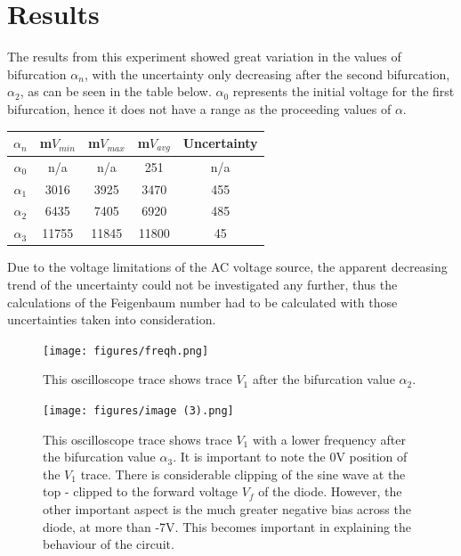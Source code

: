 \documentclass[10pt,twocolumn,letterpaper]{article}
\begin{document}
\section{Results}

The results from this experiment showed great variation in the values of bifurcation \(\alpha_n\), with the uncertainty only decreasing after the second bifurcation, \(\alpha_2\), as can be seen in the table below.  \(\alpha_0\) represents the initial voltage for the first bifurcation, hence it does not have a range as the proceeding values of \(\alpha\). 

\begin{table}[h]
\begin{tabular}{|c|cccc|}
\hline
\(\alpha_n\)  & m\(V_{min}\) & m\(V_{max}\) & m\(V_{avg}\) & Uncertainty  \\ \hline
\(\alpha_0\)  & n/a          & n/a          & 251          & n/a          \\
\(\alpha_1\)  & 3016         & 3925         & 3470         & 455          \\
\(\alpha_2\)  & 6435         & 7405         & 6920         & 485          \\ 
\(\alpha_3\)  & 11755        & 11845        & 11800        & 45           \\ \hline
\end{tabular}
\end{table}

Due to the voltage limitations of the AC voltage source, the apparent decreasing trend of the uncertainty could not be investigated any further, thus the calculations of the Feigenbaum number had to be calculated with those uncertainties taken into consideration.

\begin{figure}[h]
  \centering
  \texttt{[image: figures/freqh.png]}
  \caption{This oscilloscope trace shows trace \(V_1\) after the bifurcation value \(\alpha_2\).}
\end{figure}
\begin{figure}[h]
  \centering
  \texttt{[image: figures/image (3).png]}
  \caption{This oscilloscope trace shows trace \(V_1\) with a lower frequency after the bifurcation value \(\alpha_3\).  It is important to note the 0V position of the \(V_1\) trace.  There is considerable clipping of the sine wave at the top - clipped to the forward voltage \(V_f\) of the diode.  However, the other important aspect is the much greater negative bias across the diode, at more than -7V.  This becomes important in explaining the behaviour of the circuit.}
\end{figure}
\end{document}

